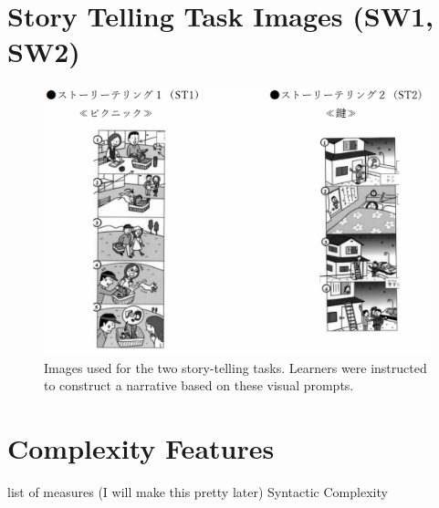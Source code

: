 \section{Story Telling Task Images (SW1, SW2)}
\begin{figure}[h!]
    \centering
    \includegraphics[scale=.45]{img/ST.png}
    \caption[Story Telling Tasks]{Images used for the two story-telling tasks. Learners were instructed to construct a narrative based on these visual prompts. }
    \label{fig:ST}
\end{figure}


\section{Complexity Features}
list of measures (I will make this pretty later)
Syntactic Complexity


